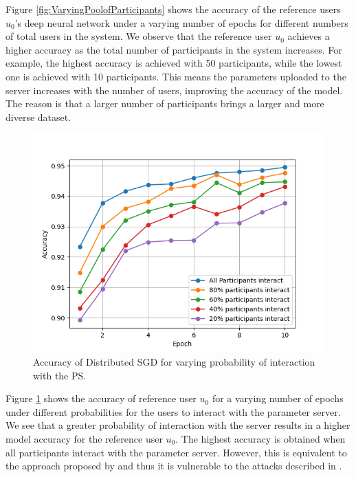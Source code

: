 \documentclass[conference]{IEEEtran}
\begin{document}
Figure \ref{fig:VaryingPoolofParticipants} shows the accuracy of the reference users $u_0$'s deep neural network under a varying number
of epochs for different numbers of total users in the system. We observe that  the reference user $u_0$ achieves a higher accuracy as
the total number of participants in the system increases. For example, the highest accuracy is achieved with 50 participants, while the
lowest one is achieved with 10 participants. This means the parameters uploaded to the server increases with the number of users, improving the accuracy of the
model. The reason is that a larger  number of participants brings a larger and more diverse dataset. 

\begin{figure}[!h]
\centering
\includegraphics[width=\columnwidth, keepaspectratio]{VaryingProbabilityInteractionGrid}
\caption{Accuracy of Distributed SGD for varying probability of interaction with the PS. }
\label{fig:VaryingProbabilityInteraction}
\end{figure}

Figure \ref{fig:VaryingProbabilityInteraction} shows the accuracy of reference user $u_0$ for a varying number of epochs under
different probabilities for the users to interact with the parameter server. 
We see that a greater probability of interaction with the server results in a higher model accuracy for the reference user $u_0$.
The highest accuracy is obtained when all participants interact with the parameter server. However, this is equivalent to the
approach proposed by \cite{shokri2015privacy} and thus it is vulnerable to the attacks described in \cite{hitaj2017deep}. 
\end{document}
